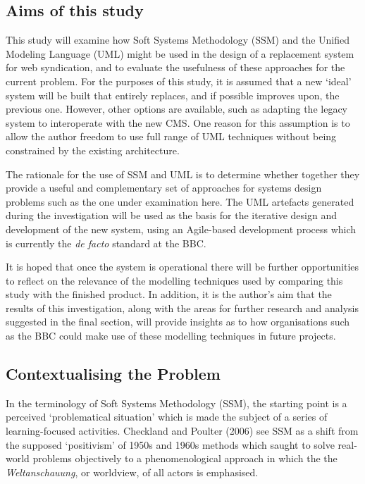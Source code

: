 \documentclass[a4paper]{article}
\begin{document}
\subsection{Aims of this study}

This study will examine how Soft Systems Methodology (SSM) and the Unified Modeling Language (UML) might be used in the design of a replacement system for web syndication, and to evaluate the usefulness of these approaches for the current problem. For the purposes of this study, it is assumed that a new `ideal' system will be built that entirely replaces, and if possible improves upon, the previous one. However, other options are available, such as adapting the legacy system to interoperate with the new CMS. One reason for this assumption is to allow the author freedom to use full range of UML techniques without being constrained by the existing architecture.

The rationale for the use of SSM and UML is to determine whether together they provide a useful and complementary set of approaches for systems design problems such as the one under examination here. The UML artefacts generated during the investigation will be used as the basis for the iterative design and development of the new system, using an Agile-based development process which is currently the \textit{de facto} standard at the BBC.

It is hoped that once the system is operational there will be further opportunities to reflect on the relevance of the modelling techniques used by comparing this study with the finished product. In addition, it is the author's aim that the results of this investigation, along with the areas for further research and analysis suggested in the final section, will provide insights as to how organisations such as the BBC could make use of these modelling techniques in future projects.

\subsection{Contextualising the Problem}

In the terminology of Soft Systems Methodology (SSM), the starting point is a perceived `problematical situation' which is made the subject of a series of learning-focused activities. Checkland and Poulter (2006) see SSM as a shift from the supposed `positivism' of 1950s and 1960s methods which saught to solve real-world problems objectively to a phenomenological approach in which the the \textit{Weltanschauung}, or worldview, of all actors is emphasised.
\end{document}
